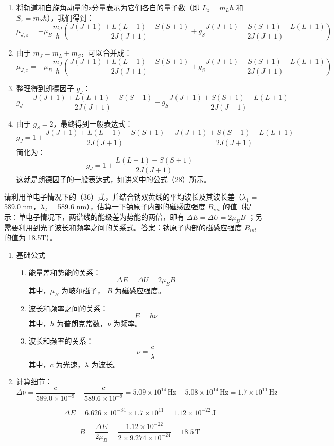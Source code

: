 \documentclass[dvipsnames, svgnames,a4paper,11pt]{article}
\begin{document}
\begin{enumerate}
\begin{enumerate}
			\item 将轨道和自旋角动量的z分量表示为它们各自的量子数（即 \(L_z = m_L \hbar\) 和 \(S_z = m_S \hbar\)），我们得到：
			\[
			\mu_{J,z} = -\mu_B \frac{m_J}{\hbar} \left( \frac{J(J+1) + L(L+1) - S(S+1)}{2J(J+1)} + g_S \frac{J(J+1) + S(S+1) - L(L+1)}{2J(J+1)} \right)
			\]
			
			\item 由于 \(m_J = m_L + m_S\)，可以合并成：
			\[
			\mu_{J,z} = -\mu_B \frac{m_J}{\hbar} \left( \frac{J(J+1) + L(L+1) - S(S+1)}{2J(J+1)} + g_S \frac{J(J+1) + S(S+1) - L(L+1)}{2J(J+1)} \right)
			\]
			
			\item 整理得到朗德因子 \(g_J\)：
			\[
			g_J = \frac{J(J+1) + L(L+1) - S(S+1)}{2J(J+1)} + g_S \frac{J(J+1) + S(S+1) - L(L+1)}{2J(J+1)}
			\]
			
			\item 由于 \(g_S = 2\)，最终得到一般表达式：
			\[
			g_J = 1 + \frac{J(J+1) + L(L+1) - S(S+1)}{2J(J+1)} - \frac{J(J+1) + S(S+1) - L(L+1)}{2J(J+1)}
			\]
			简化为：
			\[
			g_J = 1 + \frac{L(L+1) - S(S+1)}{2J(J+1)}
			\]
			这就是朗德因子的一般表达式，如讲义中的公式（28）所示。
			\end{enumerate}
		\end{enumerate}
	
	\begin{question}
		请利用单电子情况下的（36）式，并结合钠双黄线的平均波长及其波长差（$\lambda_1$ = 589.0 nm，$\lambda_2$  = 589.6 nm），估算一下钠原子内部的磁感应强度 $B_{int}$ 的值（提示：单电子情况下，两谱线的能级差为势能的两倍，即有 $\Delta E = \Delta U =2 \mu_B B$ ；另需要利用到光子波长和频率之间的关系式。答案：钠原子内部的磁感应强度 $B_{int}$ 的值为 18.5T）。
	\end{question}
	\begin{enumerate}
		\item 基础公式
		\begin{enumerate}
			\item 能量差和势能的关系：
			\[
			\Delta E = \Delta U = 2 \mu_B B
			\]
			其中，\(\mu_B\) 为玻尔磁子， \(B\) 为磁感应强度。
			
			\item 波长和频率之间的关系：
			\[
			E = h \nu
			\]
			其中，\(h\) 为普朗克常数，\(\nu\) 为频率。
			
			\item 波长和频率的关系：
			\[
			\nu = \frac{c}{\lambda}
			\]
			其中，\(c\) 为光速，\(\lambda\) 为波长。
		\end{enumerate}
		
		\item 计算细节：
		\[
		\Delta \nu = \frac{c}{589.0 \times 10^{-9}} - \frac{c}{589.6 \times 10^{-9}} = 5.09 \times 10^{14} \, \text{Hz} - 5.08 \times 10^{14} \, \text{Hz} = 1.7 \times 10^{11} \, \text{Hz}
		\]
		
		\[
		\Delta E = 6.626 \times 10^{-34} \times 1.7 \times 10^{11} = 1.12 \times 10^{-22} \, \text{J}
		\]
		
		\[
		B = \frac{\Delta E}{2 \mu_B} = \frac{1.12 \times 10^{-22}}{2 \times 9.274 \times 10^{-24}} = 18.5 \, \text{T}
		\]
	\end{enumerate}
	
\end{document}
